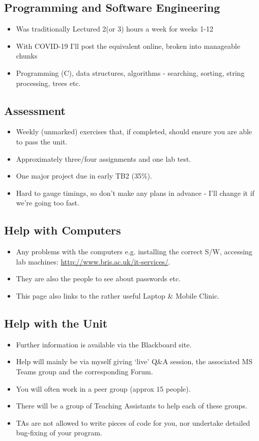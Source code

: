 \documentclass[a4,portraitt]{slides}
\begin{document}
\newpage
\subsection*{Programming and Software Engineering}
\begin{itemize}
\item Was traditionally Lectured 2(or 3) hours a week for weeks 1-12 
\item With COVID-19 I'll post the equivalent online, broken
into manageable chunks
\item Programming (C), data structures, algorithms - searching, sorting, string processing, trees etc.
\end{itemize}

\newpage
\subsection*{Assessment}
\begin{itemize}
\item Weekly (unmarked) exercises that, if completed, should ensure you are able to pass the unit.
\item Approximately three/four assignments and one lab test.
\item One major project due in early TB2 (35\%).
\item Hard to gauge timings, so don't make any plans in advance -
I'll change it if we're going too fast.
\end{itemize}

\newpage
{\samepage
\subsection*{Help with Computers}
\begin{itemize}
\item Any problems with the computers e.g. installing the correct S/W, accessing lab machines: \url{http://www.bris.ac.uk/it-services/}.
\item They are also the people to see about passwords etc.
\item This page also links to the rather useful Laptop \& Mobile Clinic.
\end{itemize}
}

\newpage
{\samepage
\subsection*{Help with the Unit}
\begin{itemize}
\item Further information is available via the Blackboard site.
\item Help will mainly be via myself giving `live' Q\&A session, the associated MS Teams group and the corresponding Forum.
\item You will often work in a peer group (approx $15$ people).
\item There will be a group of Teaching Assistants to help each of these groups.
\item TAs are not allowed to write pieces of code for you,
nor undertake detailed bug-fixing of your program.
\end{itemize}
}
\end{document}
